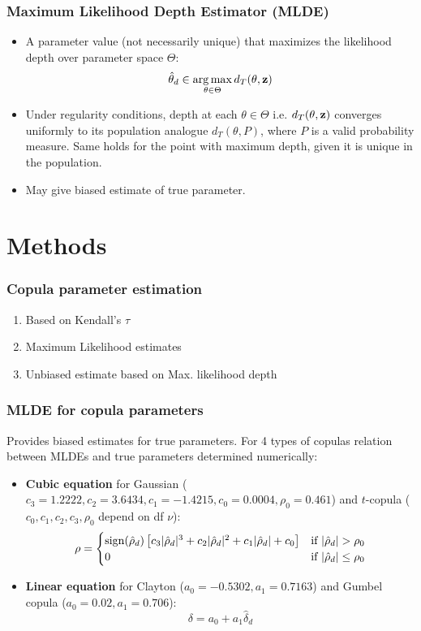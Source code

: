 \documentclass[handout,10pt]{beamer}
\begin{document}
\begin{frame}
\frametitle{Maximum Likelihood Depth Estimator (MLDE)}
\begin{itemize}
\item A parameter value (not necessarily unique) that maximizes the likelihood depth over parameter space $\Theta$:
$$ \hat\theta_d \in \operatorname*{arg\,max}_{\theta\in\Theta} d_T(\theta,{\bf{z}}) $$

\item Under regularity conditions, depth at each $\theta\in\Theta$ i.e. $d_T(\theta,{\bf{z}})$ converges uniformly to its population analogue $d_T(\theta,P)$, where $P$ is a valid probability measure. Same holds for the point with maximum depth, given it is unique in the population.
\vspace{.2cm}
\item May give biased estimate of true parameter.
\end{itemize}
\end{frame}

\section{Methods}

\begin{frame}
\frametitle{Copula parameter estimation}
\begin{enumerate}
\item Based on Kendall's $\tau$
\vspace{.2cm}
\item {\colbbf Maximum Likelihood estimates}
\vspace{.2cm}
\item {\colbbf Unbiased estimate based on Max. likelihood depth}
\end{enumerate}
\end{frame}

\begin{frame}
\frametitle{MLDE for copula parameters}
Provides biased estimates for true parameters. For 4 types of copulas relation between MLDEs and true parameters determined numerically:
\begin{itemize}
\item \textbf{Cubic equation} for Gaussian ($c_3=1.2222, c_2=3.6434, c_1=-1.4215,c_0=0.0004,\rho_0=0.461$) and $t$-copula ($c_0,c_1,c_2,c_3,\rho_0$ depend on df $\nu$):
$$ \rho = \begin{cases}
\operatorname*{sign}(\hat\rho_d)\left[c_3|\hat\rho_d|^3 + c_2|\hat\rho_d|^2 + c_1|\hat\rho_d| + c_0\right]
&\mbox{if } |\hat\rho_d| > \rho_0\\ 0 &\mbox{if }|\hat\rho_d| \leq \rho_0 
\end{cases}$$
\item \textbf{Linear equation} for Clayton ($a_0=-0.5302, a_1=0.7163$) and Gumbel copula ($a_0=0.02, a_1=0.706$):
$$ \delta = a_0 +a_1\hat\delta_d $$
\end{itemize}
\end{frame}
\end{document}
